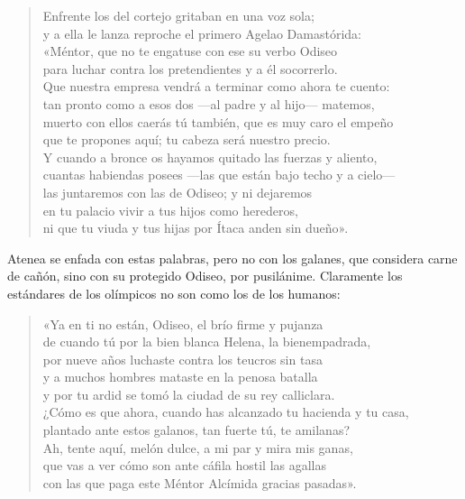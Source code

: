 \begin{verse}
Enfrente los del cortejo gritaban en una voz sola;\\
y a ella le lanza reproche el primero Agelao Damastórida:\\
«Méntor, que no te engatuse con ese su verbo Odiseo\\
para luchar contra los pretendientes y a él socorrerlo.\\
Que nuestra empresa vendrá a terminar como ahora te cuento:\\
tan pronto como a esos dos ---al padre y al hijo--- matemos,\\
muerto con ellos caerás tú también, que es muy caro el empeño\\
que te propones aquí; tu cabeza será nuestro precio.\\
Y cuando a bronce os hayamos quitado las fuerzas y aliento,\\
cuantas habiendas posees ---las que están bajo techo y a cielo---\\
las juntaremos con las de Odiseo; y ni dejaremos\\
en tu palacio vivir a tus hijos como herederos,\\
ni que tu viuda y tus hijas por Ítaca anden sin dueño».
\end{verse}

Atenea se enfada con estas palabras, pero no con los galanes, que considera carne de cañón, sino con su protegido Odiseo, por pusilánime. Claramente los estándares de los olímpicos no son como los de los humanos:

\begin{verse}
«Ya en ti no están, Odiseo, el brío firme y pujanza\\
de cuando tú por la bien blanca Helena, la bienempadrada,\\
por nueve años luchaste contra los teucros sin tasa\\
y a muchos hombres mataste en la penosa batalla\\
y por tu ardid se tomó la ciudad de su rey calliclara.\\
¿Cómo es que ahora, cuando has alcanzado tu hacienda y tu casa,\\
plantado ante estos galanos, tan fuerte tú, te amilanas?\\
Ah, tente aquí, melón dulce, a mi par y mira mis ganas,\\
que vas a ver cómo son ante cáfila hostil las agallas\\
con las que paga este Méntor Alcímida gracias pasadas».
\end{verse}

